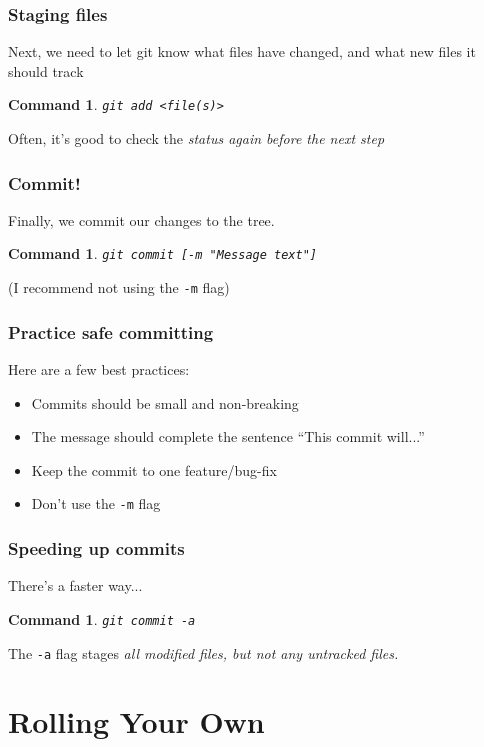 \documentclass{beamer}
\newtheorem{command}[theorem]{Command}
\begin{document}
\begin{frame}
    \frametitle{Staging files}
    Next, we need to let git know what files have changed, and what new files it should track
    \begin{command}
        \texttt{git add <file(s)>}
    \end{command}
    \pause
    Often, it's good to check the \em{status} again before the next step
\end{frame}

\begin{frame}
    \frametitle{Commit!}
    Finally, we commit our changes to the tree.
    \begin{command}
        \texttt{git commit [-m "Message text"]}
    \end{command}
    \pause
    (I recommend not using the \texttt{-m} flag)
\end{frame}


\begin{frame}
    \frametitle{Practice safe committing}
    Here are a few best practices:
    \begin{itemize}
        \item Commits should be small and non-breaking
        \item The message should complete the sentence ``This commit will...''
        \item Keep the commit to one feature/bug-fix
        \item Don't use the \texttt{-m} flag
    \end{itemize}
\end{frame}

\begin{frame}
    \frametitle{Speeding up commits}
    There's a faster way...
    \begin{command}
        \texttt{git commit -a}
    \end{command}
    The \texttt{-a} flag stages \em{all} modified files, but not any untracked files.
\end{frame}

\section{Rolling Your Own}
\end{document}
